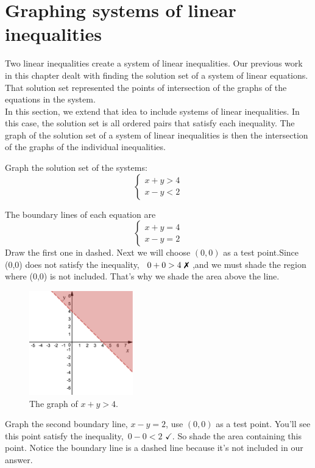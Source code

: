 \section{Graphing systems of linear inequalities}
Two linear inequalities create a system of linear inequalities. Our previous work in this chapter dealt with finding the solution set of a system of linear equations. That solution set represented the points of intersection of the graphs of the equations in the system. \\
In this section, we extend that idea to include systems of linear inequalities. In this case, the solution set is all ordered pairs that satisfy each inequality. The graph of the solution set of a system of linear inequalities is then the intersection of the graphs of the individual inequalities.
\begin{example}
	Graph the solution set of the systems:
	\begin{equation*}
		\begin{cases}
			x+y >4 \\
			x-y <2
		\end{cases}
	\end{equation*}
\end{example}
%
The boundary lines of each equation are
	\begin{equation*}
		\begin{cases}
			x+y =4 \\
			x-y =2
		\end{cases}
	\end{equation*}
%
Draw the first one in dashed. Next we will choose $(0,0)$ as a test point.Since (0,0) does not satisfy the inequality, \, $0+0>4\,\,\xmark$ ,and we must shade the region where (0,0) is not included.  That’s why we shade the area above the line.
%
\begin{figure}[H]
 \includegraphics[width=4.5cm]{pics/pic3.png}
 \centering
  \caption{The graph of $x+y>4$.}
\end{figure}
%
Graph the second boundary line, $x-y=2$, use $(0,0)$ as a test point. You'll see this point satisfy the inequality,\, $0-0<2\,\,\checkmark$. So shade the area containing this point. Notice the boundary line is a dashed line because it’s not included in our answer. 
